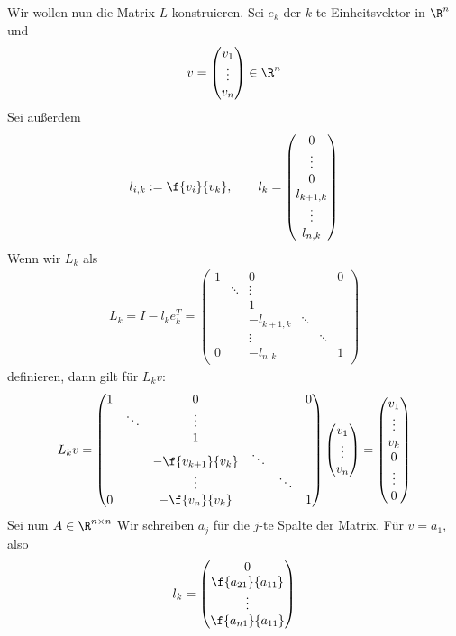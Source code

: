 \documentclass{mycourse}
\begin{document}
Wir wollen nun die Matrix $L$ konstruieren.
Sei $e_k$ der $k$-te Einheitsvektor in $\R^n$ und
\[
v=\begin{pmatrix}v_1\\\vdots\\ v_n\end{pmatrix}\in \R^n
\]
Sei außerdem
\[
	l_{i,k} := \f{v_{i}}{v_{k}}, 
	\qquad l_k = \begin{pmatrix}0 \\ \vdots \\ 0 \\ l_{k+1,k} \\ \vdots \\ l_{n,k}\end{pmatrix}
\]
Wenn wir $L_k$ als
\begin{align}
\label{eq:3.4}
L_k = I-l_ke_k^T 
= \begin{pmatrix}
	1 &  & 0 &  &  & 0\\
	 & \ddots & \vdots &  &   & \\
	 & & 1 &  &  & \\
					& & -l_{k+1,k} & \ddots & & \\
		   & & \vdots & & \ddots & \\
	  0 &  & -l_{n,k} & & & 1
\end{pmatrix}
\end{align}
definieren, dann gilt für $L_kv$:
\[
L_kv
= \begin{pmatrix}
	1 &  & 0 &  &  & 0\\
	 & \ddots & \vdots &  &   & \\
	 & & 1 &  &  & \\
		& & -\f{v_{k+1}}{v_k} & \ddots & & \\
		   & & \vdots & & \ddots & \\
	  0 &  & -\f{v_n}{v_k} & & & 1
\end{pmatrix}
\begin{pmatrix}
v_1\\ \vdots \\ v_n
\end{pmatrix}
=\begin{pmatrix}
v_1 \\\vdots \\ v_k\\ 0\\\vdots \\ 0
\end{pmatrix}
\]
Sei nun $A\in\R^{n\times n}$
Wir schreiben $a_j$ für die $j$-te Spalte der Matrix.
Für $v=a_1$, also
\[
	l_k = \begin{pmatrix} 0 \\ \f {a_{21}}{a_{11}} \\ \vdots \\ \f{a_{n1}}{a_{11}}\end{pmatrix}
\]
\end{document}
